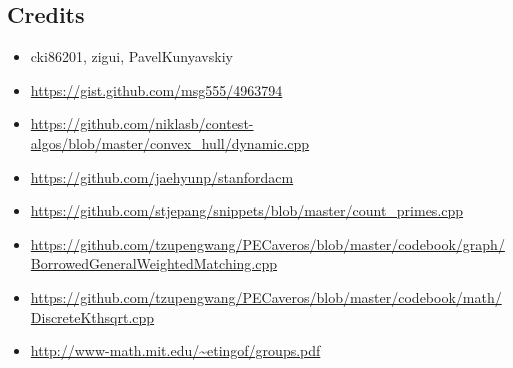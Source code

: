 \documentclass[landscape, 8pt, a4paper, oneside, twocolumn]{extarticle}
\begin{document}
\subsection {Credits}
\begin{itemize}[noitemsep,nolistsep]
	\item cki86201, zigui, PavelKunyavskiy
	\item \url{https://gist.github.com/msg555/4963794}
	\item \url{https://github.com/niklasb/contest-algos/blob/master/convex_hull/dynamic.cpp}
	\item \url{https://github.com/jaehyunp/stanfordacm}
	\item \url{https://github.com/stjepang/snippets/blob/master/count_primes.cpp}
	\item \url{https://github.com/tzupengwang/PECaveros/blob/master/codebook/graph/BorrowedGeneralWeightedMatching.cpp}
	\item \url{https://github.com/tzupengwang/PECaveros/blob/master/codebook/math/DiscreteKthsqrt.cpp}
	\item \url{http://www-math.mit.edu/~etingof/groups.pdf}
\end{itemize}
\end{document}
